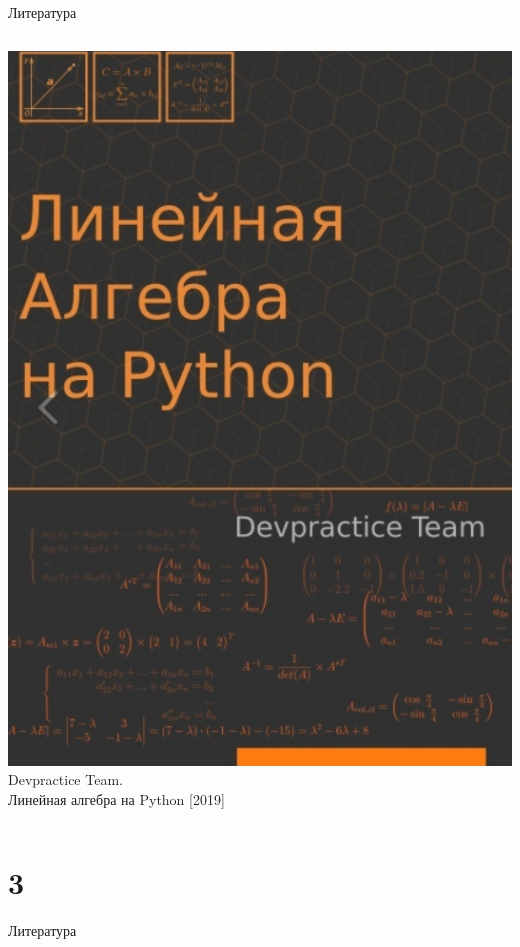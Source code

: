 \documentclass[12pt]{beamer}
\begin{document}
\begin{frame}{Литература}
\begin{columns}[onlytextwidth,T]
    \column{30mm}
	\includegraphics[scale=0.4]{image/math_pybook.png}
    \column{\dimexpr\linewidth-30mm-20mm}
	Devpractice Team. \\Линейная алгебра на Python [2019]         
    \end{columns}  
\end{frame}


\part{3}

\begin{frame}[t]{Литература}

\end{frame}
\end{document}

